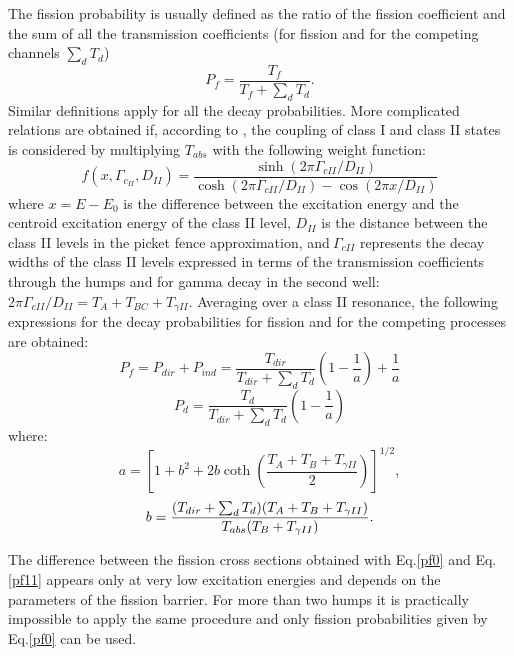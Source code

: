 The fission probability is usually defined as the ratio of the
fission coefficient and the sum of all the transmission coefficients (for
fission and for the competing channels $\sum_dT_d$)
\begin{equation}
P_{f}=\frac{T_{f}}{T_{f}+\sum_{d}T_{d}}.  \label{pf0}
\end{equation}
Similar definitions apply for all the decay probabilities. More complicated
relations are obtained if, according to \cite{Back:74}, the coupling of
class I and class II states is considered by multiplying $T_{abs}$ with the
following weight function:%
\begin{equation}
f(x,\Gamma_{c_{II}},D_{II})=\frac{\sinh(2\pi\Gamma_{cII}/D_{II})}{\cosh
(2\pi\Gamma_{cII}/D_{II})-\cos(2\pi x/D_{II})}
\end{equation}
where $x=E-E_{0}$ is the difference between the excitation energy and the
centroid excitation energy of the class II level, $D_{II}$ is the distance
between the class II levels in the picket fence approximation, and$\ \Gamma
_{cII}$ represents the decay widths of the class II levels expressed in
terms of the transmission coefficients through the humps and for gamma decay
in the second well:\ $2\pi\Gamma_{cII}/D_{II}=T_{A}+T_{BC}+T_{\gamma II}.$
Averaging over a class II resonance, the following expressions for the decay
probabilities for fission and for the competing processes are obtained:%
\begin{equation}
P_{f}=P_{dir}+P_{ind}=\frac{T_{dir}}{T_{dir}+\sum_{d}T_{d}}\left( 1-\frac {1%
}{a}\right) +\frac{1}{a}  \label{pf11}
\end{equation}
\begin{equation}
P_{d}=\frac{T_{d}}{T_{dir}+\sum_{d}T_{d}}\left( 1-\frac{1}{a}\right)
\label{pd}
\end{equation}
where:
\begin{equation}
a=\left[ 1+b^{2}+2b\coth\left( \frac{T_{A}+T_{B}+T_{\gamma II}}{2}\right) %
\right] ^{1/2},  \label{a11}
\end{equation}%
\begin{equation}
b=\frac{(T_{dir}+\sum_{d}T_{d})(T_{A}+T_{B}+T_{\gamma II})}{%
T_{abs}(T_{B}+T_{\gamma II})}.  \label{b11}
\end{equation}

The difference between the fission cross sections obtained with Eq.\ref{pf0}
and Eq.\ref{pf11} appears only at very low excitation energies and
depends on the parameters of the fission barrier. For more
than two humps it is practically impossible to apply the same procedure and
only fission probabilities given by Eq.\ref{pf0} can be used.

